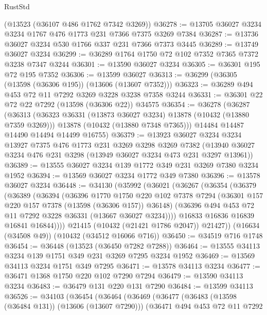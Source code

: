 \begin{lexlean}{RustStd}
\begin{coremodule}
    (@13523 (@36107 @486 @1762 @7342 @3269))
@36278 := @13705 @36027 @3234 @3234 @1767 @476 @1773 @231 @7366 @7375 @3269 @7384
@36287 := @13736 @36027 @3234 @530 @1766 @337 @231 @7366 @7373 @3445
@36289 := @13749 @36027 @3234
@36299 := @36289 @1764 @1750 @72 @102 @7352 @7365 @7372 @3238 @7347 @3244
@36301 := @13590 @36027 @3234
@36305 := @36301 @195 @72 @195 @7352
@36306 := @13599 @36027
@36313 := @36299 (@36305 (@13598 (@36306 @195)) (@13606 (@13607 @7352)))
@36323 := @36289 @494 @453 @72 @11 @7292 @3269 @3228 @3238 @7358 @3244
@36331 := @36301 @22 @72 @22 @7292 (@13598 (@36306 @22)) @34575
@36354 := @36278
    (@36287
      (@36313
        (@36323 @36331 (@13873 @36027 @3234) @13878 (@10432 (@13880 @7359 @3269)))
        @13878
        (@10432 (@13880 @7348 @7365)))
      @14484
      @14487
      @14490
      @14494
      @14499
      @16755)
@36379 := @13923
    @36027
    @3234
    @3234
    @13927
    @7375
    @476
    @1773
    @231
    @3269
    @3298
    @3269
    @7382
    (@13940 @36027 @3234 @476 @231 @3298 (@13949 @36027 @3234 @473 @231 @3297 @13961))
@36389 := @13555 @36027 @3234 @139 @1772 @349 @231 @3269 @7380 @3234 @1952
@36394 := @13569 @36027 @3234 @1772 @349 @7380
@36396 := @13578 @36027 @3234
@36448 := @34130
    (@35992
      (@36021
        (@36267
          (@36354
            (@36379
              (@36389
                (@36394
                  (@36396
                    @1770
                    @1750
                    @220
                    @102
                    @7378
                    @7294
                    (@36301 @157 @220 @157 @7378 (@13598 (@36306 @157)) @36148)
                    (@36396 @494 @453 @72 @11 @7292 @3228 @36331 (@13667 @36027 @3234))))
                @16833
                @16836
                @16839
                @16841
                @16844))))
        @21415
        (@10432 (@21421 @1786 @2047))
        @21427))
    (@16634 (@34508 @49))
    (@10432 (@34512 @16066 @716))
@36450 := @34519 @716 @1748
@36454 := @36448 (@13523 (@36450 @7282 @7288))
@36464 := @13555 @34113 @3234 @139 @1751 @349 @231 @3269 @7295 @3234 @1952
@36469 := @13569 @34113 @3234 @1751 @349 @7295
@36471 := @13578 @34113 @3234
@36477 := @36471 @1368 @1750 @220 @102 @7290 @7294
@36479 := @13590 @34113 @3234
@36483 := @36479 @131 @220 @131 @7290
@36484 := @13599 @34113
@36526 := @34103
    (@36454
      (@36464
        (@36469
          (@36477
            (@36483 (@13598 (@36484 @131)) (@13606 (@13607 @7290)))
            (@36471
              @494
              @453
              @72
              @11
              @7292

\end{coremodule}
\end{lexlean}
